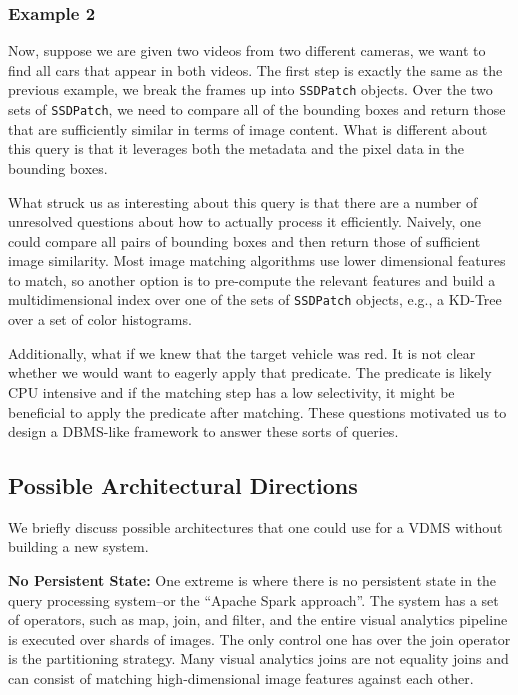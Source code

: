 \subsubsection{Example 2}
Now, suppose we are given two videos from two different cameras, we want to find all cars that appear in both videos.
The first step is exactly the same as the previous example, we break the frames up into \texttt{SSDPatch} objects.
Over the two sets of \texttt{SSDPatch}, we need to compare all of the bounding boxes and return those that are sufficiently similar in terms of image content.
What is different about this query is that it leverages both the metadata and the pixel data in the bounding boxes.

What struck us as interesting about this query is that there are a number of unresolved questions about how to actually process it efficiently.
Naively, one could compare all pairs of bounding boxes and then return those of sufficient image similarity.
Most image matching algorithms use lower dimensional features to match, so another option is to pre-compute the relevant features and build a multidimensional index over one of the sets of \texttt{SSDPatch} objects, e.g., a KD-Tree over a set of color histograms.

Additionally, what if we knew that the target vehicle was red.
It is not clear whether we would want to eagerly apply that predicate. 
The predicate is likely CPU intensive and if the matching step has a low selectivity, it might be beneficial to apply the predicate after matching.
These questions motivated us to design a DBMS-like framework to answer these sorts of queries.

\subsection{Possible Architectural Directions}
We briefly discuss possible architectures that one could use for a VDMS without building a new system.

\vspace{0.5em} \noindent \textbf{No Persistent State: } One extreme is where there is no persistent state in the query processing system--or the ``Apache Spark approach''. The system has a set of operators, such as map, join, and filter, and the entire visual analytics pipeline is executed over shards of images. The only control one has over the join operator is the partitioning strategy. Many visual analytics joins are not equality joins and can consist of matching high-dimensional image features against each other.

